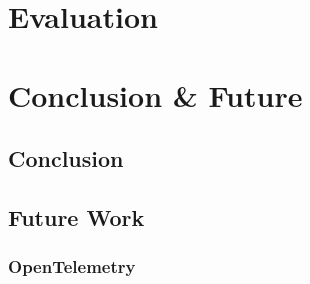 \documentclass[12pt,pdftex,titlepage]{report}
\begin{document}
    \chapter{Evaluation}


    
    \chapter{Conclusion \& Future}
        \section{Conclusion}

        \section{Future Work}
            \subsection{OpenTelemetry}
\end{document}
